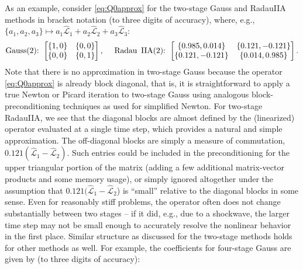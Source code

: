 \documentclass[review]{siamart}
\begin{document}
As an example, consider \eqref{eq:Q0approx} for the two-stage Gauss and
RadauIIA methods in bracket notation (to three digits of accuracy),
where, e.g., $\{a_1,a_2,a_3\}\mapsto
a_1\widehat{\mathcal{L}}_1 + a_2\widehat{\mathcal{L}}_2 + a_3\widehat{\mathcal{L}}_3$:
%
\begin{align*}
\textnormal{Gauss(2):} \hspace{1ex}
	\begin{bmatrix}
	\{1,0\} & \{0,0\} \\
	 \{0,0\} & \{0,1\} \\
	\end{bmatrix},
	\hspace{3ex}
\textnormal{Radau\, IIA(2):} \hspace{1ex}
	\begin{bmatrix}
	\{0.985,0.014\} & \{0.121,-0.121\}\\
	\{0.121,-0.121\} & \{0.014,0.985\}\\
	\end{bmatrix}.
\end{align*}
%
Note that there is no approximation in two-stage Gauss because the operator
\eqref{eq:Q0approx} is already block diagonal, that is, it is straightforward to
apply a true Newton or Picard iteration to two-stage Gauss using analogous
block-preconditioning techniques as used for simplified Newton. For two-stage
RadauIIA, we see that the diagonal blocks are almost defined by the (linearized)
operator evaluated at a single time step, which provides a natural and simple
approximation. The off-diagonal blocks are simply a measure of commutation,
$0.121(\widehat{\mathcal{L}}_1 - \widehat{\mathcal{L}}_2)$. Such entries could
be included in the preconditioning for the upper triangular portion of the
matrix (adding a few additional matrix-vector products and some memory usage),
or simply ignored altogether under the assumption that
$0.121(\widehat{\mathcal{L}}_1 - \widehat{\mathcal{L}}_2$) is ``small'' relative
to the diagonal blocks in some sense. Even for reasonably stiff problems, the
operator often does not change substantially between two stages -- if it did,
e.g., due to a shockwave, the larger time step may not be small enough to
accurately resolve the nonlinear behavior in the first place. Similar structure
as discussed for the two-stage methods holds for other methods as well. For
example, the coefficients for four-stage Gauss are given by (to three digits of
accuracy):
%
\end{document}
